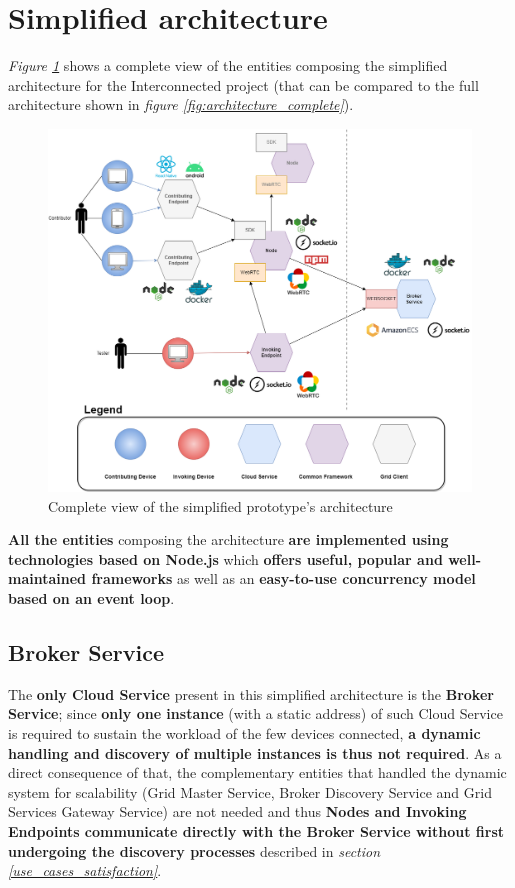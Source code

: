 \section{Simplified architecture}
\textit{Figure \ref{fig:simplified_architecture}} shows a complete view of the entities composing the simplified architecture for the Interconnected project (that can be compared to the full architecture shown in \textit{figure \ref{fig:architecture_complete}}).

\begin{figure}[!ht]
    \centering
    \includegraphics[width=\linewidth]{document/chapters/chapter_7/images/simplified_architecture.png}
    \caption{Complete view of the simplified prototype's architecture}
    \label{fig:simplified_architecture}
\end{figure}

\vspace{10mm}

\textbf{All the entities} composing the architecture \textbf{are implemented using technologies based on Node.js} which \textbf{offers useful, popular and well-maintained frameworks} as well as an \textbf{easy-to-use concurrency model based on an event loop}.

\subsection{Broker Service}
The \textbf{only Cloud Service} present in this simplified architecture is the \textbf{Broker Service}; since \textbf{only one instance} (with a static address) of such Cloud Service is required to sustain the workload of the few devices connected, \textbf{a dynamic handling and discovery of multiple instances is thus not required}. As a direct consequence of that, the complementary entities that handled the dynamic system for scalability (Grid Master Service, Broker Discovery Service and Grid Services Gateway Service) are not needed and thus \textbf{Nodes and Invoking Endpoints communicate directly with the Broker Service without first undergoing the discovery processes} described in \textit{section \ref{use_cases_satisfaction}}.

